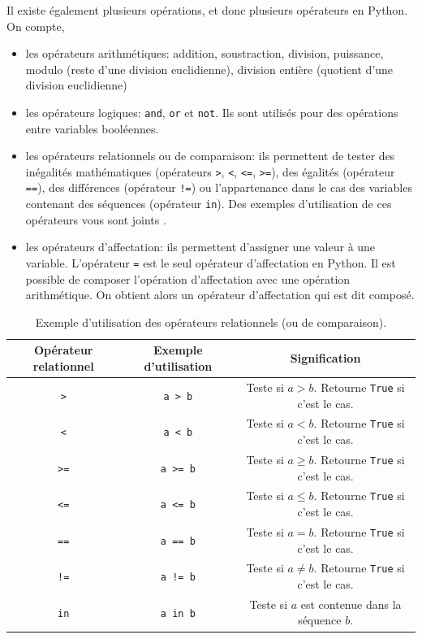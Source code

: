 \documentclass[titlepage]{article}
\theoremstyle{cleanremark}
\begin{document}
\noindent Il existe également plusieurs opérations, et donc plusieurs opérateurs en Python. On compte, 
\begin{itemize}
    \item les opérateurs arithmétiques: addition, soustraction, division, puissance, modulo (reste d'une division euclidienne), division entière (quotient d'une division euclidienne)
    \item les opérateurs logiques: \texttt{and}, \texttt{or} et \texttt{not}. Ils sont utilisés pour des opérations entre variables booléennes.
    \item les opérateurs relationnels ou de comparaison: ils permettent de tester des inégalités mathématiques (opérateurs \texttt{>}, \texttt{<}, \texttt{<=}, \texttt{>=}), des égalités (opérateur \texttt{==}), des différences (opérateur \texttt{!=}) ou l'appartenance dans le cas des variables contenant des séquences (opérateur \texttt{in}). Des exemples d'utilisation de ces opérateurs vous sont joints . 
    \item les opérateurs d'affectation: ils permettent d'assigner une valeur à une variable. L'opérateur \texttt{=} est le seul opérateur d'affectation en Python. Il est possible de composer l'opération d'affectation avec une opération arithmétique. On obtient alors un opérateur d'affectation qui est dit composé.
\end{itemize}


\begin{table}[t!]
    \centering
    \begin{tabular}{c|c|c}
         Opérateur relationnel & Exemple d'utilisation & Signification\\
        \hline 
        \hline
        \texttt{>}       & \texttt{a > b} & Teste si $a>b$. Retourne \texttt{True} si c'est le cas. \\
        \texttt{<}       & \texttt{a < b} & Teste si $a<b$. Retourne \texttt{True} si c'est le cas. \\
        \texttt{>=}       & \texttt{a >= b} & Teste si $a\geq b$. Retourne \texttt{True} si c'est le cas. \\
        \texttt{<=}       & \texttt{a <= b} & Teste si $a\leq b$. Retourne \texttt{True} si c'est le cas. \\
        \texttt{==}       &  \texttt{a == b} & Teste si $a=b$. Retourne \texttt{True} si c'est le cas. \\
        \texttt{!=}       & \texttt{a != b} & Teste si $a\neq b$. Retourne \texttt{True} si c'est le cas.\\
        \texttt{in}       & \texttt{a in b} & Teste si $a$ est contenue  dans la séquence $b$.
    \end{tabular}
    \caption{Exemple d'utilisation des opérateurs relationnels (ou de comparaison).}
    \label{tab:ops_comparison}
\end{table}
\end{document}
